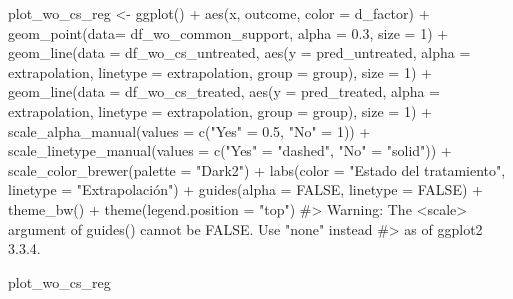 \documentclass[
  letterpaper,
  DIV=11,
  numbers=noendperiod,
  oneside]{scrreprt}
\newenvironment{Shaded}{\begin{snugshade}}{\end{snugshade}}
\newcommand{\AttributeTok}[1]{\textcolor[rgb]{0.40,0.45,0.13}{#1}}
\newcommand{\CommentTok}[1]{\textcolor[rgb]{0.37,0.37,0.37}{#1}}
\newcommand{\ConstantTok}[1]{\textcolor[rgb]{0.56,0.35,0.01}{#1}}
\newcommand{\DecValTok}[1]{\textcolor[rgb]{0.68,0.00,0.00}{#1}}
\newcommand{\FloatTok}[1]{\textcolor[rgb]{0.68,0.00,0.00}{#1}}
\newcommand{\FunctionTok}[1]{\textcolor[rgb]{0.28,0.35,0.67}{#1}}
\newcommand{\NormalTok}[1]{\textcolor[rgb]{0.00,0.23,0.31}{#1}}
\newcommand{\OtherTok}[1]{\textcolor[rgb]{0.00,0.23,0.31}{#1}}
\newcommand{\SpecialCharTok}[1]{\textcolor[rgb]{0.37,0.37,0.37}{#1}}
\newcommand{\StringTok}[1]{\textcolor[rgb]{0.13,0.47,0.30}{#1}}
\begin{document}
\begin{Shaded}
\begin{Highlighting}[]
\NormalTok{plot\_wo\_cs\_reg }\OtherTok{\textless{}{-}} 
  \FunctionTok{ggplot}\NormalTok{() }\SpecialCharTok{+}
  \FunctionTok{aes}\NormalTok{(x, outcome, }\AttributeTok{color =}\NormalTok{ d\_factor) }\SpecialCharTok{+}
  \FunctionTok{geom\_point}\NormalTok{(}\AttributeTok{data=}\NormalTok{ df\_wo\_common\_support, }\AttributeTok{alpha =} \FloatTok{0.3}\NormalTok{, }\AttributeTok{size =} \DecValTok{1}\NormalTok{) }\SpecialCharTok{+}
  \FunctionTok{geom\_line}\NormalTok{(}\AttributeTok{data =}\NormalTok{ df\_wo\_cs\_untreated,}
            \FunctionTok{aes}\NormalTok{(}\AttributeTok{y =}\NormalTok{ pred\_untreated,}
                \AttributeTok{alpha =}\NormalTok{ extrapolation,}
                \AttributeTok{linetype =}\NormalTok{ extrapolation,}
                \AttributeTok{group =}\NormalTok{ group), }\AttributeTok{size =} \DecValTok{1}\NormalTok{) }\SpecialCharTok{+}
  \FunctionTok{geom\_line}\NormalTok{(}\AttributeTok{data =}\NormalTok{ df\_wo\_cs\_treated,}
            \FunctionTok{aes}\NormalTok{(}\AttributeTok{y =}\NormalTok{ pred\_treated,}
                \AttributeTok{alpha =}\NormalTok{ extrapolation,}
                \AttributeTok{linetype =}\NormalTok{ extrapolation,}
                \AttributeTok{group =}\NormalTok{ group), }\AttributeTok{size =} \DecValTok{1}\NormalTok{) }\SpecialCharTok{+}
  \FunctionTok{scale\_alpha\_manual}\NormalTok{(}\AttributeTok{values =} \FunctionTok{c}\NormalTok{(}\StringTok{"Yes"} \OtherTok{=} \FloatTok{0.5}\NormalTok{, }\StringTok{"No"} \OtherTok{=} \DecValTok{1}\NormalTok{)) }\SpecialCharTok{+}
  \FunctionTok{scale\_linetype\_manual}\NormalTok{(}\AttributeTok{values =} \FunctionTok{c}\NormalTok{(}\StringTok{"Yes"} \OtherTok{=} \StringTok{"dashed"}\NormalTok{, }\StringTok{"No"} \OtherTok{=} \StringTok{"solid"}\NormalTok{)) }\SpecialCharTok{+}
  \FunctionTok{scale\_color\_brewer}\NormalTok{(}\AttributeTok{palette =} \StringTok{"Dark2"}\NormalTok{) }\SpecialCharTok{+}
  \FunctionTok{labs}\NormalTok{(}\AttributeTok{color =} \StringTok{"Estado del tratamiento"}\NormalTok{,}
       \AttributeTok{linetype =} \StringTok{"Extrapolación"}\NormalTok{) }\SpecialCharTok{+}
  \FunctionTok{guides}\NormalTok{(}\AttributeTok{alpha =} \ConstantTok{FALSE}\NormalTok{,}
         \AttributeTok{linetype =} \ConstantTok{FALSE}\NormalTok{) }\SpecialCharTok{+}
  \FunctionTok{theme\_bw}\NormalTok{() }\SpecialCharTok{+}
  \FunctionTok{theme}\NormalTok{(}\AttributeTok{legend.position =} \StringTok{"top"}\NormalTok{)}
\CommentTok{\#\textgreater{} Warning: The \textasciigrave{}\textless{}scale\textgreater{}\textasciigrave{} argument of \textasciigrave{}guides()\textasciigrave{} cannot be \textasciigrave{}FALSE\textasciigrave{}. Use "none" instead}
\CommentTok{\#\textgreater{} as of ggplot2 3.3.4.}

\NormalTok{plot\_wo\_cs\_reg}
\end{Highlighting}
\end{Shaded}
\end{document}
